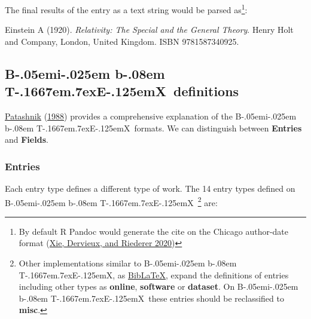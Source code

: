 \documentclass[
]{article}
\def\BibTeX{{\rm B\kern-.05em{\sc i\kern-.025em b}\kern-.08em
    T\kern-.1667em\lower.7ex\hbox{E}\kern-.125emX}}
\begin{document}
The final results of the entry as a text string would be parsed
as\footnote{By default R Pandoc would generate the cite on the Chicago
  author-date format (\protect\hyperlink{ref-rmarkdowncookbook2020}{Xie,
  Dervieux, and Riederer 2020})}:

Einstein A (1920). \emph{Relativity: The Special and the General
Theory}. Henry Holt and Company, London, United Kingdom. ISBN
9781587340925.

\hypertarget{definitions}{%
\subsection{\texorpdfstring{\BibTeX~definitions}{~definitions}}\label{definitions}}

\protect\hyperlink{ref-patashnik1988}{Patashnik}
(\protect\hyperlink{ref-patashnik1988}{1988}) provides a comprehensive
explanation of the \BibTeX~formats. We can distinguish between
\textbf{Entries} and \textbf{Fields}.

\hypertarget{entries}{%
\subsubsection{Entries}\label{entries}}

Each entry type defines a different type of work. The 14 entry types
defined on \BibTeX~\footnote{Other implementations similar to \BibTeX,
  as \href{https://www.ctan.org/pkg/biblatex}{BibLaTeX}, expand the
  definitions of entries including other types as \textbf{online},
  \textbf{software} or \textbf{dataset}. On \BibTeX~these entries should
  be reclassified to \textbf{misc}.} are:
\end{document}
